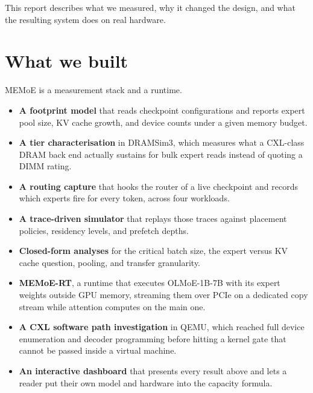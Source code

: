 \documentclass[10pt,a4paper]{article}
\begin{document}
This report describes what we measured, why it changed the design, and what the
resulting system does on real hardware.

\section{What we built}

MEMoE is a measurement stack and a runtime.

\begin{itemize}
\item \textbf{A footprint model} that reads checkpoint configurations and reports
      expert pool size, KV cache growth, and device counts under a given memory
      budget.
\item \textbf{A tier characterisation} in DRAMSim3, which measures what a CXL-class
      DRAM back end actually sustains for bulk expert reads instead of quoting a
      DIMM rating.
\item \textbf{A routing capture} that hooks the router of a live checkpoint and
      records which experts fire for every token, across four workloads.
\item \textbf{A trace-driven simulator} that replays those traces against placement
      policies, residency levels, and prefetch depths.
\item \textbf{Closed-form analyses} for the critical batch size, the expert versus
      KV cache question, pooling, and transfer granularity.
\item \textbf{MEMoE-RT}, a runtime that executes OLMoE-1B-7B with its expert
      weights outside GPU memory, streaming them over PCIe on a dedicated copy
      stream while attention computes on the main one.
\item \textbf{A CXL software path investigation} in QEMU, which reached full device
      enumeration and decoder programming before hitting a kernel gate that cannot
      be passed inside a virtual machine.
\item \textbf{An interactive dashboard} that presents every result above and lets a
      reader put their own model and hardware into the capacity formula.
\end{itemize}




\end{document}
